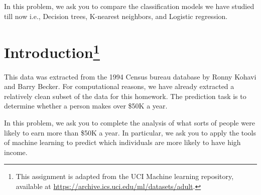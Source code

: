 \documentclass[11pt]{article}
\begin{document}
In this problem, we ask you to compare the classification models we have studied till now i.e., Decision trees, K-nearest neighbors, and Logistic regression. 
\section*{Introduction\footnote{This assignment is adapted from the UCI Machine learning repository, available at \url{https://archive.ics.uci.edu/ml/datasets/adult}.}}

This data was extracted from the 1994 Census bureau database by Ronny Kohavi and Barry Becker. For computational reasons, we have already extracted a relatively clean subset of the data for this homework. The prediction task is to determine whether a person makes over \$50K a year.

In this problem, we ask you to complete the analysis of what sorts of people were likely to earn more than \$50K a year. In particular, we ask you to apply the tools of machine learning to predict which individuals are more likely to have high income. 
\end{document}
